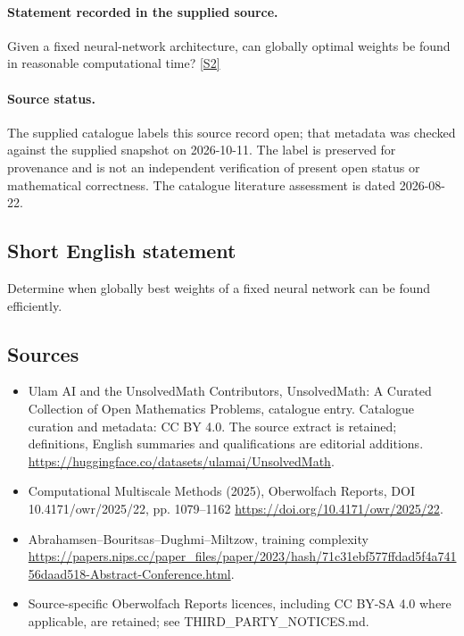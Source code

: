 \documentclass[11pt]{article}
\begin{document}
\paragraph{Statement recorded in the supplied source.}
Given a fixed neural-network architecture, can globally optimal weights be found in reasonable computational time? \href{https://doi.org/10.4171/owr/2025/22}{[S2]}
\paragraph{Source status.}
The supplied catalogue labels this source record open; that metadata was checked against the supplied snapshot on 2026-10-11. The label is preserved for provenance and is not an independent verification of present open status or mathematical correctness. The catalogue literature assessment is dated 2026-08-22.
\subsection{Short English statement}
Determine when globally best weights of a fixed neural network can be found efficiently.
\subsection{Sources}
\begin{itemize}
\item[S1] Ulam AI and the UnsolvedMath Contributors, UnsolvedMath: A Curated Collection of Open Mathematics Problems, catalogue entry. Catalogue curation and metadata: CC BY 4.0. The source extract is retained; definitions, English summaries and qualifications are editorial additions.
\url{https://huggingface.co/datasets/ulamai/UnsolvedMath}.
\item[S2] Computational Multiscale Methods (2025), Oberwolfach Reports, DOI 10.4171/owr/2025/22, pp. 1079--1162
\url{https://doi.org/10.4171/owr/2025/22}.
\item[S3] Abrahamsen--Bouritsas--Dughmi--Miltzow, training complexity
\url{https://papers.nips.cc/paper_files/paper/2023/hash/71c31ebf577ffdad5f4a74156daad518-Abstract-Conference.html}.
\item Source-specific Oberwolfach Reports licences, including CC BY-SA 4.0 where applicable, are retained; see THIRD\_PARTY\_NOTICES.md.
\end{itemize}
\end{document}
